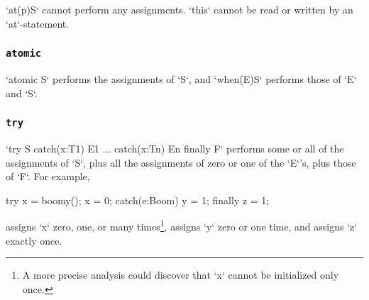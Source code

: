 
\xcd`at(p)S` cannot perform any assignments.  \xcd`this` cannot be read or
written by an \xcd`at`-statement.

\subsubsection{{\tt atomic}}

\xcd`atomic S` performs the assignments of \xcd`S`, 
and \xcd`when(E)S` performs those of \xcd`E` and \xcd`S`.  

\subsubsection{{\tt try}}

\xcd`try S catch(x:T1) E1 ... catch(x:Tn) En  finally F` 
performs some or all of the assignments of \xcd`S`, plus all the assignments
of zero or one of the \xcd`E`'s, plus those of \xcd`F`.  
For example,
\begin{xten}
try {
  x = boomy();
  x = 0;
}
catch(e:Boom) { y = 1; }
finally { z = 1; }
\end{xten}
\noindent 
assigns \xcd`x` zero, one, or many times\footnote{A more precise
analysis could discover that \xcd`x` cannot be initialized only once.}, 
assigns \xcd`y` zero or one time, and assigns \xcd`z` exactly once.


